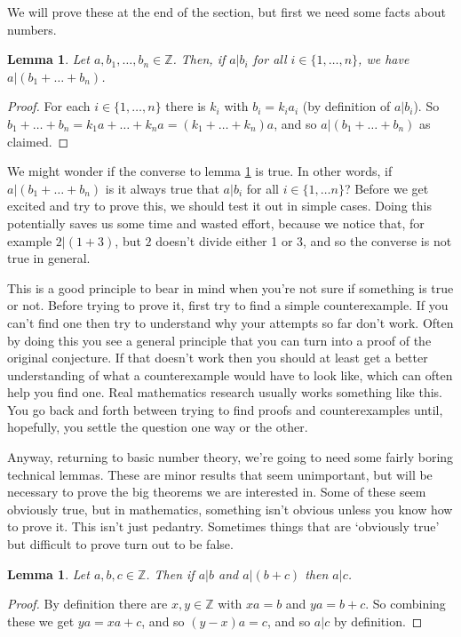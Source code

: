 \documentclass{article}
\theoremstyle{plain}
\newtheorem{lemma}[theorem]{Lemma}{\bfseries}{\upshape}
\newcommand{\bZ}{\mathbb{Z}}
\newcommand*{\prefix}{}
\begin{document}
We will prove these at the end of the section, but first we need some facts about numbers.
\begin{lemma}\label{\prefix L:plus}
Let $a,b_1,\ldots,b_n\in\bZ$. Then, if $a|b_i$ for all $i\in \{1,\ldots,n\}$, we have $a|(b_1+\ldots +b_n)$.
\end{lemma}
\begin{proof}
For each $i\in\{1,\ldots,n\}$ there is $k_i$ with $b_i=k_ia_i$ (by definition of $a|b_i$). So $b_1+\ldots +b_n = k_1a+\ldots + k_n a = (k_1+\ldots + k_n)a$, and so $a|(b_1+\ldots+b_n)$ as claimed. 
\end{proof}

We might wonder if the converse to lemma \ref{L:plus} is true. In other words, if $a|(b_1+\ldots +b_n)$ is it always true that $a|b_i$ for all $i\in\{1,\ldots n\}$? Before we get excited and try to prove this, we should test it out in simple cases. Doing this potentially saves us some time and wasted effort, because we notice that, for example $2|(1+3)$, but $2$ doesn't divide either 1 or 3, and so the converse is not true in general.

This is a good principle to bear in mind when you're not sure if something is true or not. Before trying to prove it, first try to find a simple counterexample. If you can't find one then try to understand why your attempts so far don't work. Often by doing this you see a general principle that you can turn into a proof of the original conjecture. If that doesn't work then you should at least get a better understanding of what a counterexample would have to look like, which can often help you find one. Real mathematics research usually works something like this. You go back and forth between trying to find proofs and counterexamples until, hopefully, you settle the question one way or the other.

Anyway, returning to basic number theory, we're going to need some fairly boring technical lemmas. These are minor results that seem unimportant, but will be necessary to prove the big theorems we are interested in. Some of these seem obviously true, but in mathematics, something isn't obvious unless you know how to prove it. This isn't just pedantry. Sometimes things that are `obviously true' but difficult to prove turn out to be false.   

\begin{lemma}\label{\prefix L:div1}
Let $a,b,c\in \bZ$. Then if $a|b$ and $a|(b+c)$ then $a|c$.
\end{lemma}
\begin{proof}
By definition there are $x,y\in \bZ$ with $xa=b$ and $ya= b+c$. So combining these we get $ya=xa +c$, and so $(y-x)a=c$, and so $a|c$ by definition.
\end{proof}
\end{document}
